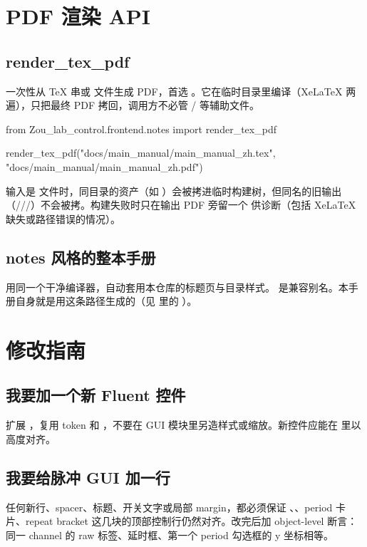 \documentclass[11pt,oneside,openany]{book}
\begin{document}
\chapter{PDF 渲染 API}

\section{render\_tex\_pdf}
一次性从 TeX 串或  文件生成 PDF，首选 。它在临时目录里编译（XeLaTeX 两遍），只把最终 PDF 拷回，调用方不必管 / 等辅助文件。

\begin{codeblock}[Python]
from Zou_lab_control.frontend.notes import render_tex_pdf

render_tex_pdf("docs/main_manual/main_manual_zh.tex",
               "docs/main_manual/main_manual_zh.pdf")
\end{codeblock}

输入是  文件时，同目录的资产（如 ）会被拷进临时构建树，但同名的旧输出（///）不会被拷。构建失败时只在输出 PDF 旁留一个  供诊断（包括 XeLaTeX 缺失或路径错误的情况）。

\section{notes 风格的整本手册}
 用同一个干净编译器，自动套用本仓库的标题页与目录样式。 是兼容别名。本手册自身就是用这条路径生成的（见  里的 ）。

\chapter{修改指南}

\section{我要加一个新 Fluent 控件}
扩展 ，复用  token 和 ，不要在 GUI 模块里另造样式或缩放。新控件应能在  里以  高度对齐。

\section{我要给脉冲 GUI 加一行}
任何新行、spacer、标题、开关文字或局部 margin，都必须保证 、、period 卡片、repeat bracket 这几块的顶部控制行仍然对齐。改完后加 object-level 断言：同一 channel 的 raw 标签、延时框、第一个 period 勾选框的 y 坐标相等。
\end{document}
